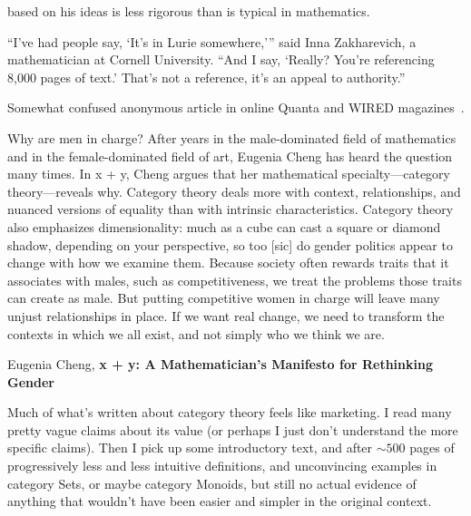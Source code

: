 \documentclass[11pt]{book}
\begin{document}
{based on his ideas is less rigorous than is typical in mathematics.
\par
``I’ve had people say, ‘It’s in Lurie somewhere,’'' 
said Inna Zakharevich, a mathematician at Cornell University. 
``And I say, ‘Really? You’re referencing 8,000 pages of text.’ 
That’s not a reference, it’s an appeal to authority.''
}
{Somewhat confused anonymous article in online 
Quanta and WIRED 
magazines~\cite{hartnett_2019_lurie,quanta_2019_lurie}.}

\pagebreak

\epigraph{
Why are men in charge? 
After years in the male-dominated field of mathematics 
and in the female-dominated field of art, 
Eugenia Cheng has heard the question many times. 
In x + y, Cheng argues that her mathematical 
specialty---category theory---reveals why. 
Category theory deals more with context, relationships, 
and nuanced versions of equality than 
with intrinsic characteristics. 
Category theory also emphasizes dimensionality: 
much as a cube can cast a square or diamond shadow, 
depending on your perspective, 
so too [sic] do gender politics appear to change 
with how we examine them. 
Because society often rewards traits 
that it associates with males, such as competitiveness, 
we treat the problems those traits can create as male. 
But putting competitive women in charge will leave 
many unjust relationships in place. 
If we want real change, 
we need to transform the contexts in which we all exist, 
and not simply who we think we are.
}
{Eugenia Cheng, \textbf{x + y:
A Mathematician’s Manifesto for Rethinking 
Gender}~\cite{cheng_2020_about}}


Much of what's written about category theory feels like marketing.
I read many pretty vague claims about its value
(or perhaps I just don't understand the more specific claims).
Then I pick up some introductory text,
and after ${\sim}500$ pages of progressively less and less 
intuitive definitions, and unconvincing examples in category Sets,
or maybe category Monoids,
but still no actual evidence of anything that wouldn't have been
easier and simpler in the original context.
\end{document}
